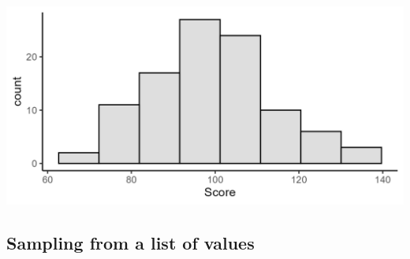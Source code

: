 \documentclass[
]{book}
\begin{document}
\includegraphics[width=20.83in]{Figs/hist_2}

\subsection*{Sampling from a list of values}\label{sampling-from-a-list-of-values}
\end{document}
